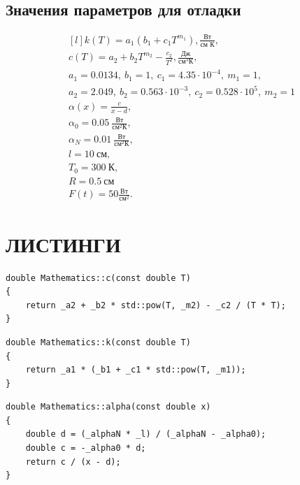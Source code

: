 \subsection{Значения параметров для отладки}

\begin{equation*}
    \begin{matrix*}[l]
        k(T) = a_1(b_1 + c_1 T^{m_1}), \frac{\text{Вт}}{\text{см К}}, \\
        c(T) = a_2 + b_2 T^{m_2} - \frac{c_2}{T^2}, \frac{\text{Дж}}{\text{см}^3 \text{К}}, \\
        a_1 = 0.0134,\ b_1 = 1,\ c_1 = 4.35 \cdot 10^{-4},\ m_1=1, \\
        a_2 = 2.049,\ b_2 = 0.563 \cdot 10^{-3},\ c_2 = 0.528 \cdot 10^5,\ m_2 = 1 \\
        \alpha(x) = \frac{c}{x-d}, \\
        \alpha_0 = 0.05\ \frac{\text{Вт}}{\text{см}^2 \text{К}}, \\
        \alpha_N = 0.01\ \frac{\text{Вт}}{\text{см}^2 \text{К}}, \\
        l = 10\ \text{см}, \\
        T_0 = 300\ \text{К}, \\
        R = 0.5\ \text{см} \\
        F(t) = 50 \frac{\text{Вт}}{\text{см}^2}.
    \end{matrix*}
\end{equation*}

\section{ЛИСТИНГИ}

\begin{lstlisting}[caption=Теплоемкость стержня]
double Mathematics::c(const double T)
{
    return _a2 + _b2 * std::pow(T, _m2) - _c2 / (T * T);
}
\end{lstlisting}

\begin{lstlisting}[caption=Коэффициент теплопроводности стержня]
double Mathematics::k(const double T)
{
    return _a1 * (_b1 + _c1 * std::pow(T, _m1));
}
\end{lstlisting}

\begin{lstlisting}[caption=Коэффициент теплоотдачи при обдуве]
double Mathematics::alpha(const double x)
{
    double d = (_alphaN * _l) / (_alphaN - _alpha0);
    double c = -_alpha0 * d;
    return c / (x - d);
}
\end{lstlisting}

